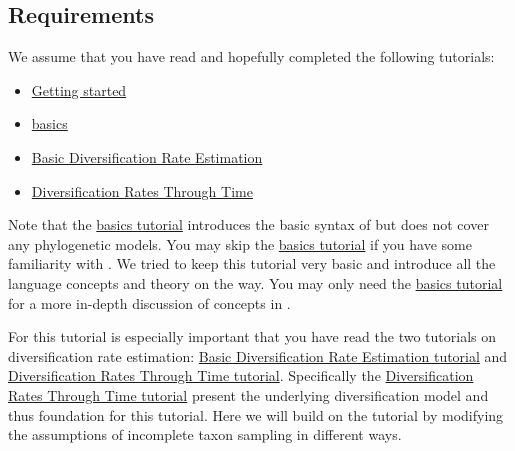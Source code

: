 \subsection{Requirements}
We assume that you have read and hopefully completed the following tutorials:
\begin{itemize}
\item \href{https://github.com/revbayes/revbayes_tutorial/raw/master/tutorial_TeX/RB_Getting_Started/RB_Getting_Started.pdf}{Getting started}
\item \href{https://github.com/revbayes/revbayes_tutorial/raw/master/tutorial_TeX/RB_Basics_Tutorial/RB_Basics_Tutorial.pdf}{\Rev basics}
\item \href{https://github.com/revbayes/revbayes_tutorial/raw/master/tutorial_TeX/RB_DiversificationRate_Tutorial/RB_DiversificationRate_Tutorial.pdf}{Basic Diversification Rate Estimation}
\item \href{https://github.com/revbayes/revbayes_tutorial/raw/master/tutorial_TeX/RB_DiversificationRate_Episodic_Tutorial/RB_DiversificationRate_Episodic_Tutorial.pdf}{Diversification Rates Through Time}
\end{itemize}
Note that the \href{https://github.com/revbayes/revbayes_tutorial/raw/master/tutorial_TeX/RB_Basics_Tutorial/RB_Basics_Tutorial.pdf}{\Rev basics tutorial} introduces the basic syntax of \Rev but does not cover any phylogenetic models.
You may skip the \href{https://github.com/revbayes/revbayes_tutorial/raw/master/tutorial_TeX/RB_Basics_Tutorial/RB_Basics_Tutorial.pdf}{\Rev basics tutorial} if you have some familiarity with \R.
We tried to keep this tutorial very basic and introduce all the language concepts and theory on the way.
You may only need the \href{https://github.com/revbayes/revbayes_tutorial/raw/master/tutorial_TeX/RB_Basics_Tutorial/RB_Basics_Tutorial.pdf}{\Rev basics tutorial} for a more in-depth discussion of concepts in \Rev.

For this tutorial is especially important that you have read the two tutorials on diversification rate estimation: \href{https://github.com/revbayes/revbayes_tutorial/raw/master/tutorial_TeX/RB_DiversificationRate_Tutorial/RB_DiversificationRate_Tutorial.pdf}{Basic Diversification Rate Estimation tutorial} and \href{https://github.com/revbayes/revbayes_tutorial/raw/master/tutorial_TeX/RB_DiversificationRate_Episodic_Tutorial/RB_DiversificationRate_Episodic_Tutorial.pdf}{Diversification Rates Through Time tutorial}.
Specifically the \href{https://github.com/revbayes/revbayes_tutorial/raw/master/tutorial_TeX/RB_DiversificationRate_Episodic_Tutorial/RB_DiversificationRate_Episodic_Tutorial.pdf}{Diversification Rates Through Time tutorial} present the underlying diversification model and thus foundation for this tutorial.
Here we will build on the tutorial by modifying the assumptions of incomplete taxon sampling in different ways.


